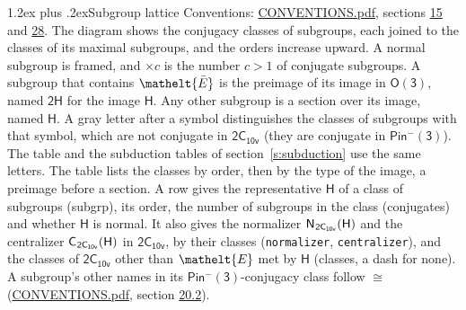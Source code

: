 \documentclass[10pt,a4paper]{article}
\makeatletter
\renewcommand\section{\@startsection{section}{1}{\z@}{-3ex plus -1ex minus -.2ex}%
  {1.2ex plus .2ex}{\normalfont\large\sffamily\bfseries\color{parttitle}}}
\numberwithin{equation}{section}
\newcommand{\eltfont}[1]{{\let\sigma\eltsigma\mathelt{#1}}}
\newcommand{\grp}[1]{\mathsf{#1}}
\newcommand{\cls}[1]{\eltfont{#1}}
\newcommand{\elt}[1]{\eltfont{#1}}
\newcommand{\samecls}{\cong}
\newcommand{\barred}[1]{\bar{#1}}
\newcommand{\hairsp}{\mkern1mu}
\makeatother
\begin{document}
\section{Subgroup lattice}\label{s:subgroups}
Conventions: \href{../../CONVENTIONS.pdf}{CONVENTIONS.pdf}, sections \href{../../../rotation/CONVENTIONS.pdf\#conv.15}{15} and \href{../../CONVENTIONS.pdf\#conv.28}{28}.
The diagram shows the conjugacy classes of subgroups, each joined to the classes of its maximal subgroups, and the orders increase upward. A normal subgroup is framed, and ${\times}c$ is the number $c > 1$ of conjugate subgroups. \label{n:group.H}A subgroup that contains $\elt{\barred{E}}$ is the preimage of its image in $\grp{O(3)}$, named $\grp{2H}$ for the image $\grp{H}$. Any other subgroup is a section over its image, named $\grp{H}$. \label{n:mark.letter}A gray letter after a symbol distinguishes the classes of subgroups with that symbol, which are not conjugate in $\grp{2C_{10v}}$ (they are conjugate in \href{Pinminus3.pdf}{$\grp{Pin^{-}(3)}$}). The table and the subduction tables of section~\ref{s:subduction} use the same letters. The table lists the classes by order, then by the type of the image, a preimage before a section. \label{n:head.subgroup}\label{n:head.order}\label{n:head.conjugates}\label{n:head.normal}A row gives the representative $\grp{H}$ of a class of subgroups (subgrp), its order, the number of subgroups in the class (conjugates) and whether $\grp{H}$ is normal. \label{n:group.normalizer}\label{n:group.centralizer}\label{n:head.classes}It also gives the normalizer $\grp{N}_{\hairsp \grp{2C_{10v}}}(\grp{H})$ and the centralizer $\grp{C}_{\hairsp \grp{2C_{10v}}}(\grp{H})$ in $\grp{2C_{10v}}$, by their classes (\texttt{normalizer}, \texttt{centralizer}), and the classes of $\grp{2C_{10v}}$ other than $\cls{E}$ met by $\grp{H}$ (classes, a dash for none). A subgroup's other names in its \href{Pinminus3.pdf}{$\grp{Pin^{-}(3)}$}-conjugacy class follow $\samecls$ (\href{../../CONVENTIONS.pdf}{CONVENTIONS.pdf}, section \href{../../CONVENTIONS.pdf\#conv.20.2}{20.2}).
\end{document}
